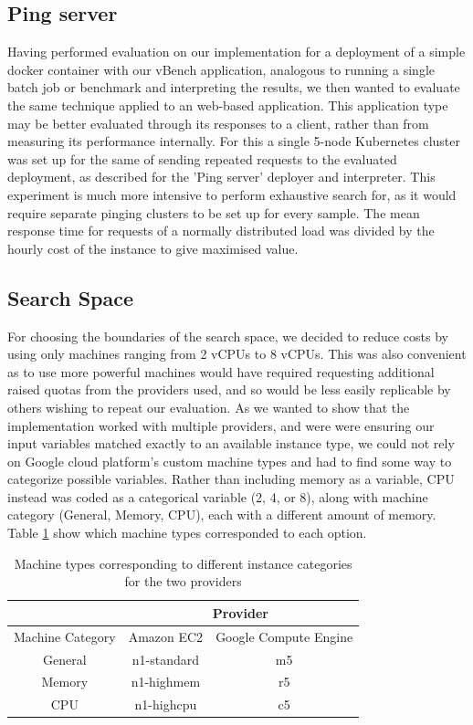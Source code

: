 \documentclass{report}
\begin{document}
\subsection{Ping server}
Having performed evaluation on our implementation for a deployment of a simple docker container with our vBench application, analogous to running a single batch job or benchmark and interpreting the results, we then wanted to evaluate the same technique applied to an web-based application. This application type may be better evaluated through its responses to a client, rather than from measuring its performance internally. For this a single 5-node Kubernetes cluster was set up for the same of sending repeated requests to the evaluated deployment, as described for the 'Ping server' deployer and interpreter. This experiment is much more intensive to perform exhaustive search for, as it would require separate pinging clusters to be set up for every sample. The mean response time for requests of a normally distributed load was divided by the hourly cost of the instance to give maximised value. 

\subsection{Search Space}
For choosing the boundaries of the search space, we decided to reduce costs by using only machines ranging from 2 vCPUs to 8 vCPUs. This was also convenient as to use more powerful machines would have required requesting additional raised quotas from the providers used, and so would be less easily replicable by others wishing to repeat our evaluation. As we wanted to show that the implementation worked with multiple providers, and were were ensuring our input variables matched exactly to an available instance type, we could not rely on Google cloud platform's custom machine types and had to find some way to categorize possible variables. Rather than including memory as a variable, CPU instead was coded as a categorical variable (2, 4, or 8), along with machine category (General, Memory, CPU), each with a different amount of memory. Table \ref{tab:instance-types} show which machine types corresponded to each option. 

\begin{table}[!ht]
\centering
\begin{tabular}{ |c||c|c|  }
 \hline
 & \multicolumn{2}{|c|}{Provider} \\
 \hline
 Machine Category & Amazon EC2 & Google Compute Engine \\
 \hline
 General& n1-standard & m5\\
 Memory & n1-highmem  & r5\\
 CPU    & n1-highcpu  & c5\\
 \hline
\end{tabular}
\caption{Machine types corresponding to different instance categories for the two providers}
\label{tab:instance-types}
\end{table}
\end{document}
